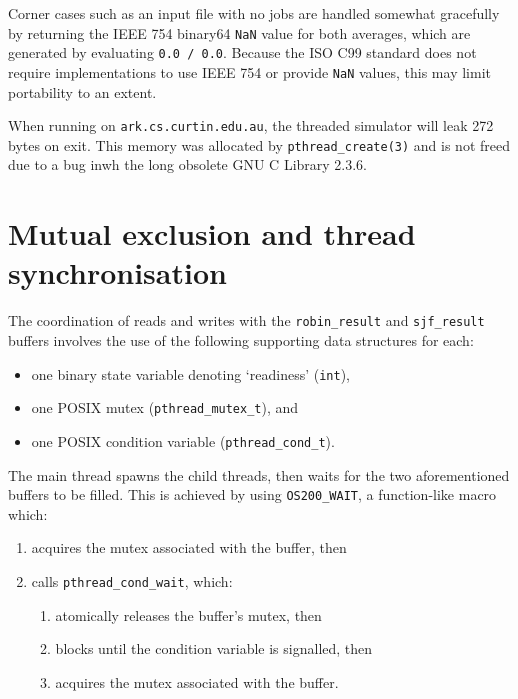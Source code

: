 \documentclass[a4paper,12pt,titlepage]{article}
\begin{document}
Corner cases such as an input file with no jobs are handled somewhat gracefully
by returning the IEEE 754 binary64 \texttt{NaN} value for both averages, which
are generated by evaluating \texttt{0.0 / 0.0}. Because the ISO C99 standard
does not require implementations to use IEEE 754 or provide \texttt{NaN}
values, this may limit portability to an extent.

When running on \texttt{ark.cs.curtin.edu.au}, the threaded simulator will leak
272 bytes on exit. This memory was allocated by \texttt{pthread\_create(3)} and
is not freed due to a bug inwh the long obsolete GNU C Library 2.3.6.

\newpage

\section{Mutual exclusion and thread synchronisation}

The coordination of reads and writes with the \texttt{robin\_result} and
\texttt{sjf\_result} buffers involves the use of the following supporting
data structures for each:

\begin{itemize}
	\item one binary state variable denoting `readiness' (\texttt{int}),
	\item one POSIX mutex (\texttt{pthread\_mutex\_t}), and
	\item one POSIX condition variable (\texttt{pthread\_cond\_t}).
\end{itemize}

The main thread spawns the child threads, then waits for the two
aforementioned buffers to be filled. This is achieved by using
\texttt{OS200\_WAIT}, a function-like macro which:

\begin{enumerate}
	\item acquires the mutex associated with the buffer, then
	\item calls \texttt{pthread\_cond\_wait}, which:
	\begin{enumerate}
		\item atomically releases the buffer's mutex, then
		\item blocks until the condition variable is signalled, then
		\item acquires the mutex associated with the buffer.
	\end{enumerate}
\end{enumerate}
\end{document}
